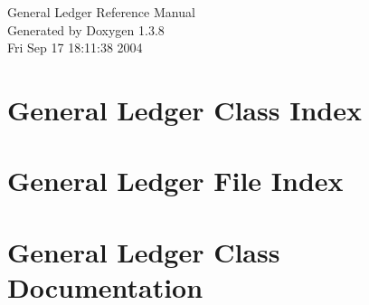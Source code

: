 \documentclass[letterpaper]{book}
\begin{document}
\begin{titlepage}
\vspace*{7cm}
\begin{center}
{\Large General Ledger Reference Manual}\\
\vspace*{1cm}
{\large Generated by Doxygen 1.3.8}\\
\vspace*{0.5cm}
{\small Fri Sep 17 18:11:38 2004}\\
\end{center}
\end{titlepage}
\clearemptydoublepage
{}
\tableofcontents
\clearemptydoublepage
{}
\chapter{General Ledger Class Index}

\chapter{General Ledger File Index}

\chapter{General Ledger Class Documentation}
































\end{document}
